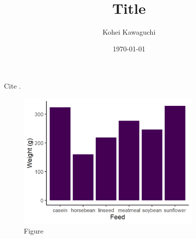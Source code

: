 \documentclass[12pt]{article}
\begin{document}
\begin{titlepage}
\title{Title}
\author{Kohei Kawaguchi}
\date{\today}
\maketitle
\begin{abstract}
\noindent

\bigskip
\end{abstract}
\setcounter{page}{0}
\thispagestyle{empty}
\end{titlepage}
\pagebreak \newpage

Cite \cite{aguirregabiriaDynamicsMarkupsInventories1999}.

\begin{figure}[H]
    \centering
    \includegraphics[width=0.8\textwidth]{figuretable/tutorial_figure_bar_ggplot2.png}
    \caption{Figure}
\end{figure}

\singlespacing
\setlength\bibsep{0pt}


\end{document}
